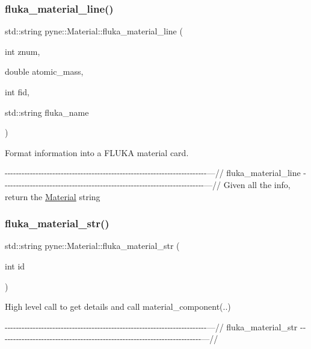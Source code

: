 \subsubsection{\texorpdfstring{fluka\+\_\+material\+\_\+line()}{fluka\_material\_line()}}
{\footnotesize\ttfamily std\+::string pyne\+::\+Material\+::fluka\+\_\+material\+\_\+line (\begin{DoxyParamCaption}\item[{int}]{znum,  }\item[{double}]{atomic\+\_\+mass,  }\item[{int}]{fid,  }\item[{std\+::string}]{fluka\+\_\+name }\end{DoxyParamCaption})}



Format information into a F\+L\+U\+KA material card. 

-\/-\/-\/-\/-\/-\/-\/-\/-\/-\/-\/-\/-\/-\/-\/-\/-\/-\/-\/-\/-\/-\/-\/-\/-\/-\/-\/-\/-\/-\/-\/-\/-\/-\/-\/-\/-\/-\/-\/-\/-\/-\/-\/-\/-\/-\/-\/-\/-\/-\/-\/-\/-\/-\/-\/-\/-\/-\/-\/-\/-\/-\/-\/-\/-\/-\/-\/-\/-\/-\/-\/-\/---// fluka\+\_\+material\+\_\+line -\/-\/-\/-\/-\/-\/-\/-\/-\/-\/-\/-\/-\/-\/-\/-\/-\/-\/-\/-\/-\/-\/-\/-\/-\/-\/-\/-\/-\/-\/-\/-\/-\/-\/-\/-\/-\/-\/-\/-\/-\/-\/-\/-\/-\/-\/-\/-\/-\/-\/-\/-\/-\/-\/-\/-\/-\/-\/-\/-\/-\/-\/-\/-\/-\/-\/-\/-\/-\/-\/-\/-\/---// Given all the info, return the \hyperlink{classpyne_1_1_material}{Material} string \mbox{\label{classpyne_1_1_material_af3f7e0865a7a8019e02c2fb3c408c2f3}} 
\subsubsection{\texorpdfstring{fluka\+\_\+material\+\_\+str()}{fluka\_material\_str()}}
{\footnotesize\ttfamily std\+::string pyne\+::\+Material\+::fluka\+\_\+material\+\_\+str (\begin{DoxyParamCaption}\item[{int}]{id }\end{DoxyParamCaption})}



High level call to get details and call material\+\_\+component(..) 

-\/-\/-\/-\/-\/-\/-\/-\/-\/-\/-\/-\/-\/-\/-\/-\/-\/-\/-\/-\/-\/-\/-\/-\/-\/-\/-\/-\/-\/-\/-\/-\/-\/-\/-\/-\/-\/-\/-\/-\/-\/-\/-\/-\/-\/-\/-\/-\/-\/-\/-\/-\/-\/-\/-\/-\/-\/-\/-\/-\/-\/-\/-\/-\/-\/-\/-\/-\/-\/-\/-\/-\/---// fluka\+\_\+material\+\_\+str -\/-\/-\/-\/-\/-\/-\/-\/-\/-\/-\/-\/-\/-\/-\/-\/-\/-\/-\/-\/-\/-\/-\/-\/-\/-\/-\/-\/-\/-\/-\/-\/-\/-\/-\/-\/-\/-\/-\/-\/-\/-\/-\/-\/-\/-\/-\/-\/-\/-\/-\/-\/-\/-\/-\/-\/-\/-\/-\/-\/-\/-\/-\/-\/-\/-\/-\/-\/-\/-\/-\/-\/---//

